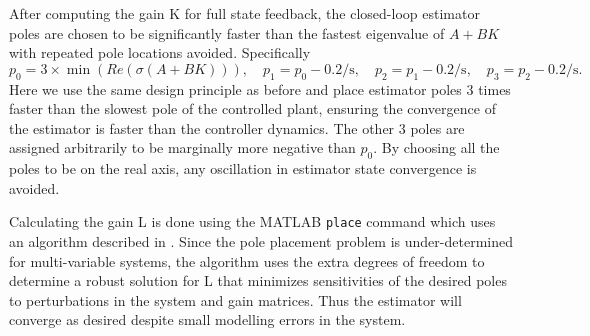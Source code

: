 \documentclass[letterpaper,11pt]{article}
\begin{document}
After computing the gain K for full state feedback, the closed-loop estimator
poles are chosen to be significantly faster than the fastest eigenvalue of
$A+BK$ with repeated pole locations avoided. Specifically
\begin{equation*}
p_0 = 3 \times \min\left(Re\left(\sigma\left(A + BK\right)\right)\right),
\quad
p_1 = p_0 - 0.2 \si{\per\s},
\quad
p_2 = p_1 - 0.2 \si{\per\s},
\quad
p_3 = p_2 - 0.2 \si{\per\s}.
\end{equation*}
Here we use the same design principle as before and place estimator poles 3
times faster than the slowest pole of the controlled plant, ensuring the
convergence of the estimator is faster than the controller dynamics. The other
3 poles are assigned arbitrarily to be marginally more negative than $p_0$.  By
choosing all the poles to be on the real axis, any oscillation in estimator
state convergence is avoided.

Calculating the gain L is done using the MATLAB \verb|place| command which uses
an algorithm described in \cite{Kautsky1985}. Since the pole placement problem
is under-determined for multi-variable systems, the algorithm uses the extra
degrees of freedom to determine a robust solution for L that minimizes
sensitivities of the desired poles to perturbations in the system and gain
matrices. Thus the estimator will converge as desired despite small modelling
errors in the system.
\end{document}
